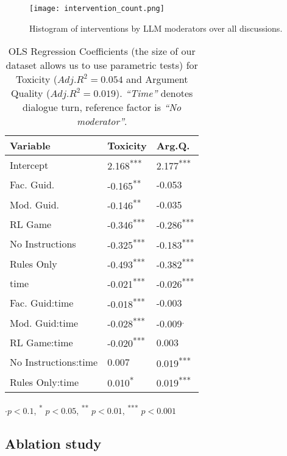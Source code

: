 \begin{figure}
	\centering
	\texttt{[image: intervention\_count.png]}
	\caption{Histogram of interventions by LLM moderators over all discussions.}
	\label{fig::intervention_count}
\end{figure}

\begin{table}[htbp]
    \centering
    \begin{tabular}{lll}
        \toprule
        \textbf{Variable} & \textbf{Toxicity} & \textbf{Arg.Q.} \\
        \midrule
        Intercept & 2.168\textsuperscript{***} & 2.177\textsuperscript{***} \\
        Fac. Guid. & -0.165\textsuperscript{**} & -0.053 \\
        Mod. Guid. & -0.146\textsuperscript{**} & -0.035 \\
        \ac{RL} Game & -0.346\textsuperscript{***} & -0.286\textsuperscript{***} \\
        No Instructions & -0.325\textsuperscript{***} & -0.183\textsuperscript{***} \\
        Rules Only & -0.493\textsuperscript{***} & -0.382\textsuperscript{***} \\
        time & -0.021\textsuperscript{***} & -0.026\textsuperscript{***} \\
        Fac. Guid:time & -0.018\textsuperscript{***} & -0.003 \\
        Mod. Guid:time & -0.028\textsuperscript{***} & -0.009\textsuperscript{.} \\
        \ac{RL} Game:time & -0.020\textsuperscript{***} & 0.003 \\
        No Instructions:time & 0.007 & 0.019\textsuperscript{***} \\
        Rules Only:time & 0.010\textsuperscript{*} & 0.019\textsuperscript{***} \\
        \bottomrule
    \end{tabular}
    \small
    $\cdot p<0.1$, \textsuperscript{*} $p<0.05$, \textsuperscript{**} $p<0.01$, \textsuperscript{***} $p<0.001$
    \normalsize
    \caption{OLS Regression Coefficients (the size of our dataset allows us to use parametric tests) for Toxicity ($Adj. R^2=0.054$ and Argument Quality ($Adj. R^2=0.019$). \textit{“Time”} denotes dialogue turn, reference factor is \textit{“No moderator”}.}
    \label{tab:timeseries}
\end{table}


\subsection{Ablation study}

